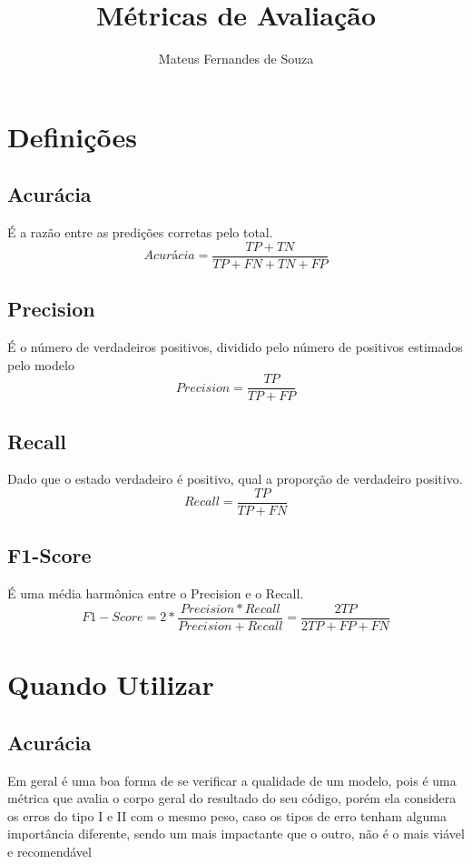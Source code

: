 \documentclass{article}
\title{Métricas de Avaliação}
\author{Mateus Fernandes de Souza}
\begin{document}
\maketitle

\section{Definições}

\subsection{Acurácia}
É a razão entre as predições corretas pelo total.
\begin{equation*}
    Acurácia = \frac{TP + TN}{TP + FN + TN + FP}
\end{equation*}

\subsection{Precision}
É o número de verdadeiros positivos, dividido pelo número de positivos estimados pelo modelo
\begin{equation*}
    Precision = \frac{TP}{TP+ FP}
\end{equation*}

\subsection{Recall}
Dado que o estado verdadeiro é positivo, qual a proporção de verdadeiro positivo.
\begin{equation*}
    Recall = \frac{TP}{TP+ FN}
\end{equation*}

\subsection{F1-Score}
É uma média harmônica entre o Precision e o Recall.
\begin{equation*}
    F1-Score = 2*\frac{Precision*Recall}{Precision+ Recall} = \frac{2TP}{2TP+ FP +FN}
\end{equation*}

\section{Quando Utilizar}

\subsection{Acurácia}
Em geral é uma boa forma de se verificar a qualidade de um modelo, pois é uma métrica que avalia o corpo geral do resultado do seu código, porém ela considera os erros do tipo I e II com o mesmo peso, caso os tipos de erro tenham alguma importância diferente, sendo um mais impactante que o outro, não é o mais viável e recomendável
\end{document}
